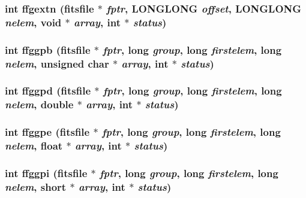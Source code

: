 \subsubsection{\setlength{\rightskip}{0pt plus 5cm}int ffgextn (\bf{fitsfile} $\ast$ {\em fptr}, \bf{LONGLONG} {\em offset}, \bf{LONGLONG} {\em nelem}, void $\ast$ {\em array}, int $\ast$ {\em status})}\label{src_2fitsio_8h_5fc4e41295a193c81ec7cccd1d682ef2}


\subsubsection{\setlength{\rightskip}{0pt plus 5cm}int ffggpb (\bf{fitsfile} $\ast$ {\em fptr}, long {\em group}, long {\em firstelem}, long {\em nelem}, unsigned char $\ast$ {\em array}, int $\ast$ {\em status})}\label{src_2fitsio_8h_4f44dabf1398b1faa74931df1070d4ef}


\subsubsection{\setlength{\rightskip}{0pt plus 5cm}int ffggpd (\bf{fitsfile} $\ast$ {\em fptr}, long {\em group}, long {\em firstelem}, long {\em nelem}, double $\ast$ {\em array}, int $\ast$ {\em status})}\label{src_2fitsio_8h_e50059a5fe73bbfe285c204a0fcbb81b}


\subsubsection{\setlength{\rightskip}{0pt plus 5cm}int ffggpe (\bf{fitsfile} $\ast$ {\em fptr}, long {\em group}, long {\em firstelem}, long {\em nelem}, float $\ast$ {\em array}, int $\ast$ {\em status})}\label{src_2fitsio_8h_5d09492332cbecfe94b123b8a0defeb9}


\subsubsection{\setlength{\rightskip}{0pt plus 5cm}int ffggpi (\bf{fitsfile} $\ast$ {\em fptr}, long {\em group}, long {\em firstelem}, long {\em nelem}, short $\ast$ {\em array}, int $\ast$ {\em status})}\label{src_2fitsio_8h_aeab60257fb251921567291948d553a2}


